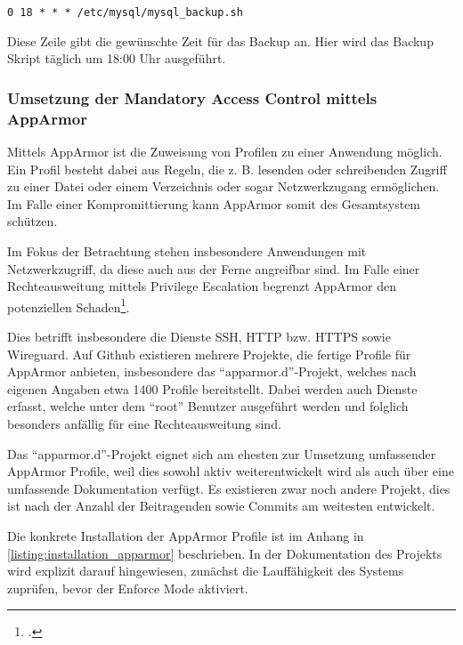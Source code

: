 \begin{verbatim}0 18 * * * /etc/mysql/mysql_backup.sh\end{verbatim}

Diese Zeile gibt die gewünschte Zeit für das Backup an. Hier wird das Backup Skript täglich um 18:00 Uhr ausgeführt.



\subsubsection{Umsetzung der Mandatory Access Control mittels AppArmor}\label{kap:installation_apparmor}

Mittels AppArmor ist die Zuweisung von Profilen zu einer Anwendung möglich. Ein Profil besteht dabei aus Regeln, die z. B. lesenden oder schreibenden Zugriff zu einer Datei oder einem Verzeichnis oder sogar Netzwerkzugang ermöglichen. Im Falle einer Kompromittierung kann AppArmor somit des Gesamtsystem schützen.

Im Fokus der Betrachtung stehen insbesondere Anwendungen mit Netzwerkzugriff, da diese auch aus der Ferne angreifbar sind. Im Falle einer Rechteausweitung mittels Privilege Escalation begrenzt AppArmor den potenziellen Schaden\footcite[Vgl.][]{hutchinsIntelligenceDrivenComputerNetwork}.

Dies betrifft insbesondere die Dienste \ac{SSH}, \ac{HTTP} bzw. \ac{HTTPS} sowie Wireguard. Auf Github existieren mehrere Projekte, die fertige Profile für AppArmor anbieten, insbesondere das \enquote{apparmor.d}-Projekt, welches nach eigenen Angaben etwa 1400 Profile bereitstellt. Dabei werden auch Dienste erfasst, welche unter dem \enquote{root} Benutzer ausgeführt werden und folglich besonders anfällig für eine Rechteausweitung sind.

Das \enquote{apparmor.d}-Projekt eignet sich am ehesten zur Umsetzung umfassender AppArmor Profile, weil dies sowohl aktiv weiterentwickelt wird als auch über eine umfassende Dokumentation verfügt. Es existieren zwar noch andere Projekt, dies ist nach der Anzahl der Beitragenden sowie Commits am weitesten entwickelt.

Die konkrete Installation der AppArmor Profile ist im Anhang in \autoref{listing:installation_apparmor} beschrieben. In der Dokumentation des Projekts wird explizit darauf hingewiesen, zunächst die Lauffähigkeit des Systems zuprüfen, bevor der Enforce Mode aktiviert.

